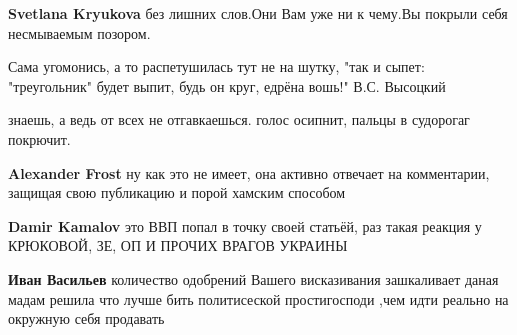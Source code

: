 \begin{itemize}
\begin{itemize}
 
\textbf{Svetlana Kryukova} без лишних слов.Они Вам уже ни к чему.Вы покрыли себя несмываемым позором.

 
Сама угомонись, а то распетушилась тут не на шутку, "так и сыпет: "треугольник" будет выпит, будь он круг, едрёна вошь!" В.С. Высоцкий

 
знаешь, а ведь от всех не отгавкаешься. голос осипнит, пальцы в судорогаг покрючит.

 
\textbf{Alexander Frost} ну как это не имеет, она активно отвечает на комментарии, защищая свою публикацию и порой хамским способом

 
\textbf{Damir Kamalov} это ВВП попал в точку своей статьёй, раз такая реакция у КРЮКОВОЙ, ЗЕ, ОП И ПРОЧИХ ВРАГОВ УКРАИНЫ

 
\textbf{Иван Васильев} количество одобрений Вашего висказивания зашкаливает даная мадам решила что лучше бить политисеской простигосподи ,чем идти реально на окружную себя продавать


\end{itemize}
\end{itemize}
